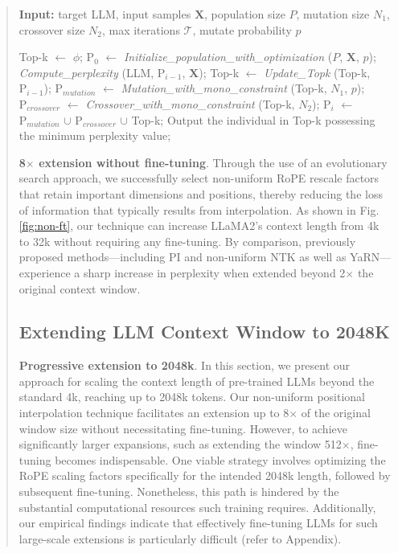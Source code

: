 \begin{abstract}
\begin{algorithm}[t]
	\small
	\caption{The search algorithm}
	\textbf{Input:} target LLM, input samples $\mathbf{X}$,   population size $P$, mutation size $N_1$, crossover size $N_2$, max iterations $\mathcal{T}$, mutate probability $p$\\

	\begin{algorithmic}[1]
		\label{alg:search}
		\STATE Top-k $\gets$ $\phi$;
		\STATE $\text{P}_0$ $\gets$ \textit{Initialize\_population\_with\_optimization} ($P$, $\mathbf{X}$, $p$);
		\STATE \textit{Compute\_perplexity} (LLM, $\text{P}_{i-1}$, $\mathbf{X}$);
		\STATE Top-k $\gets$ \textit{Update\_Topk} (Top-k, $\text{P}_{i-1}$);
		\STATE $\text{P}_{mutation}$ $\gets$ \textit{Mutation\_with\_mono\_constraint} (Top-k, $N_1$, $p$);
		\STATE $\text{P}_{crossover}$ $\gets$ \textit{Crossover\_with\_mono\_constraint} (Top-k, $N_2$);
		\STATE $\text{P}_i$ $\gets$ $\text{P}_{mutation}$ $\cup$ $\text{P}_{crossover}$ $\cup$ Top-k;
		\ENDFOR
		\STATE Output the individual in Top-k possessing the minimum perplexity value;
	\end{algorithmic}
\end{algorithm}

\textbf{8$\times$ extension without fine-tuning}. Through the use of an evolutionary search approach, we successfully select non-uniform RoPE rescale factors that retain important dimensions and positions, thereby reducing the loss of information that typically results from interpolation. As shown in Fig.\ref{fig:non-ft}, our technique can increase LLaMA2’s context length from 4k to 32k without requiring any fine-tuning. By comparison, previously proposed methods—including PI and non-uniform NTK as well as YaRN—experience a sharp increase in perplexity when extended beyond 2$\times$ the original context window.

\subsection{Extending LLM Context Window to 2048K}
\label{sec:extendto2048k}

\textbf{Progressive extension to 2048k}. In this section, we present our approach for scaling the context length of pre-trained LLMs beyond the standard 4k, reaching up to 2048k tokens. Our non-uniform positional interpolation technique facilitates an extension up to 8$\times$ of the original window size without necessitating fine-tuning. However, to achieve significantly larger expansions, such as extending the window 512$\times$, fine-tuning becomes indispensable. One viable strategy involves optimizing the RoPE scaling factors specifically for the intended 2048k length, followed by subsequent fine-tuning. Nonetheless, this path is hindered by the substantial computational resources such training requires. Additionally, our empirical findings indicate that effectively fine-tuning LLMs for such large-scale extensions is particularly difficult (refer to Appendix).


\end{abstract}
